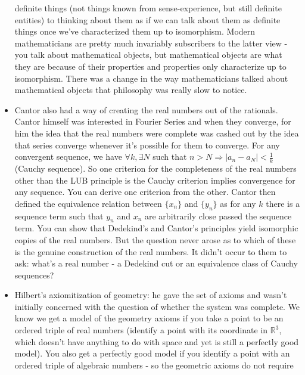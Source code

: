 \documentclass[12pt]{article}
\theoremstyle{definition}
\begin{document}
\begin{itemize}
        definite things (not things known from sense-experience, but still
        definite entities) to thinking about them as if we can talk about them
        as definite things once we've characterized them up to isomorphism.
        Modern mathematicians are pretty much invariably subscribers to the
        latter view - you talk about mathematical objects, but mathematical
        objects are what they are because of their properties and properties
        only characterize up to isomorphism. There was a change in the way
        mathematicians talked about mathematical objects that philosophy was
        really slow to notice.
    \item
        Cantor also had a way of creating the real numbers out of the
        rationals. Cantor himself was interested in Fourier Series and when
        they converge, for him the idea that the real numbers were complete was
        cashed out by the idea that series converge whenever it's possible for
        them to converge. For any convergent sequence, we have $\forall k,
        \exists N$ such that $n > N \Rightarrow |a_n - a_N| < \frac{1}{k}$
        (Cauchy sequence). So one criterion for the completeness of the real
        numbers other than the LUB principle is the Cauchy criterion implies
        convergence for any sequence. You can derive one criterion from the
        other. Cantor then defined the equivalence relation between $\{x_n\}$
        and $\{y_n\}$ as for any $k$ there is a sequence term such that $y_n$
        and $x_n$ are arbitrarily close passed the sequence term. You can show
        that Dedekind's and Cantor's principles yield isomorphic copies of the
        real numbers. But the question never arose as to which of these is the
        genuine construction of the real numbers. It didn't occur to them to
        ask: what's a real number - a Dedekind cut or an equivalence class of
        Cauchy sequences?
    \item
        Hilbert's axiomitization of geometry: he gave the set of axioms and
        wasn't initially concerned with the question of whether the system was
        complete. We know we get a model of the geometry axioms if you take a
        point to be an ordered triple of real numbers (identify a point with
        its coordinate in $\mathbb{R}^3$, which doesn't have anything to do
        with space and yet is still a perfectly good model). You also get a
        perfectly good model if you identify a point with an ordered triple of
        algebraic numbers - so the geometric axioms do not require

\end{itemize}
\end{document}

